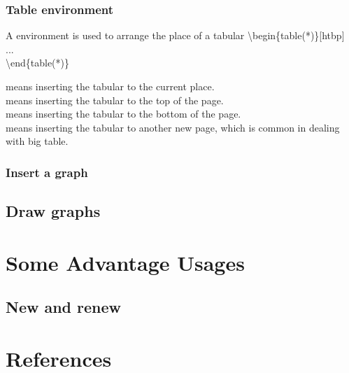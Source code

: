 \documentclass{beamer}
\begin{document}
\begin{frame}
	\frametitle{Table environment}
    \begin{definition}
    A  environment is used to arrange the place of a tabular
		{\color{red}\textbackslash begin\{table(*)\}[htbp]}\\
		\quad ...\\
		{\color{red}\textbackslash end\{table(*)\}}\\
	\end{definition}
    \text{[h]} means inserting the tabular to the current place.
    \\\text{[t]} means inserting the tabular to the top of the page.
    \\\text{[b]} means inserting the tabular to the bottom of the page.
    \\\text{[p]} means inserting the tabular to another new page, which is common in dealing with big table.
\end{frame}
\begin{frame}
	\frametitle{Insert a graph}
    
\end{frame}




\subsection{Draw graphs}

\begin{frame}

\end{frame}

\section{Some Advantage Usages}
\begin{frame}
\end{frame}

\subsection{New and renew}

\begin{frame}



\end{frame}

\section{References}
\begin{frame}
\end{frame}
\end{document}
